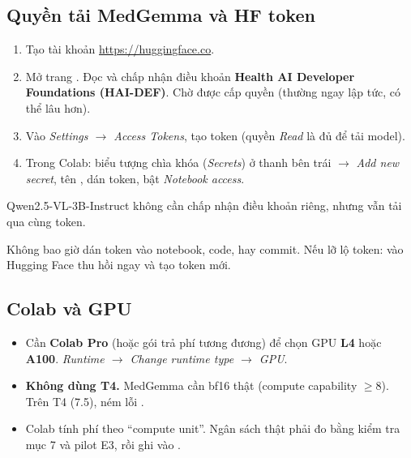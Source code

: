 \subsection{Quyền tải MedGemma và HF token}
\label{sec:hf}

\begin{enumerate}
\item Tạo tài khoản \url{https://huggingface.co}.
\item Mở trang . Đọc và chấp nhận điều khoản \textbf{Health AI Developer Foundations (HAI-DEF)}. Chờ được cấp quyền (thường ngay lập tức, có thể lâu hơn).
\item Vào \emph{Settings $\rightarrow$ Access Tokens}, tạo token (quyền \emph{Read} là đủ để tải model).
\item Trong Colab: biểu tượng chìa khóa (\emph{Secrets}) ở thanh bên trái $\rightarrow$ \emph{Add new secret}, tên , dán token, bật \emph{Notebook access}.
\end{enumerate}
Qwen2.5-VL-3B-Instruct không cần chấp nhận điều khoản riêng, nhưng vẫn tải qua cùng token.

\begin{dangerbox}
Không bao giờ dán token vào notebook, code, hay commit. Nếu lỡ lộ token: vào Hugging Face thu hồi  ngay và tạo token mới.
\end{dangerbox}

\subsection{Colab và GPU}
\label{sec:colab}

\begin{itemize}
\item Cần \textbf{Colab Pro} (hoặc gói trả phí tương đương) để chọn GPU \textbf{L4} hoặc \textbf{A100}.
      \emph{Runtime $\rightarrow$ Change runtime type $\rightarrow$ GPU}.
\item \textbf{Không dùng T4.} MedGemma cần bf16 thật (compute capability $\ge 8$). Trên T4 (7.5),  ném lỗi
      .
\item Colab tính phí theo ``compute unit''. Ngân sách thật phải đo bằng kiểm tra mục 7 và pilot E3, rồi ghi vào .
\end{itemize}

